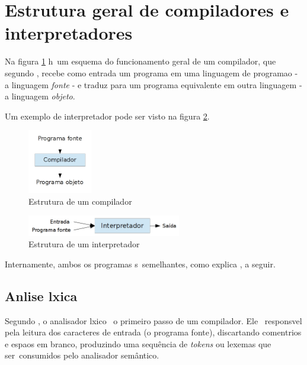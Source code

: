 
\section{Estrutura geral de compiladores e interpretadores}
\label{revisao:estrutura-geral}

Na figura \ref{fig:compilador} h\ah\ um esquema do funcionamento geral de um compilador, que segundo \cite{Aho08}, recebe como entrada um programa em uma linguagem de programa\ca o - a linguagem \emph{fonte} - e traduz para um programa equivalente em outra linguagem - a linguagem \emph{objeto}.

Um exemplo de interpretador pode ser visto na figura \ref{fig:interpretador}.

\begin{figure}[htp]
  \begin{center}
    \includegraphics[width=0.25\textwidth]{figuras/compilador}
  \end{center}
  \caption{Estrutura de um compilador}
  \label{fig:compilador}
\end{figure}

\begin{figure}[htp]
  \begin{center}
    \includegraphics[width=0.6\textwidth]{figuras/interpretador}
  \end{center}
  \caption{Estrutura de um interpretador}
  \label{fig:interpretador}
\end{figure}

Internamente, ambos os programas s\ao\ semelhantes, como explica \cite{Aho08}, a seguir.

\subsection{An\ah lise l\eh xica}

Segundo \cite{Aho08}, o analisador l\eh xico \eh\ o primeiro passo de um compilador. Ele \eh\ respons\ah vel pela leitura dos caracteres de entrada (o programa fonte), discartando coment\ah rios e espa\cc os em branco, produzindo uma sequ\^encia de \emph{tokens} ou lexemas que ser\ao\ consumidos pelo analisador sem\^antico.

